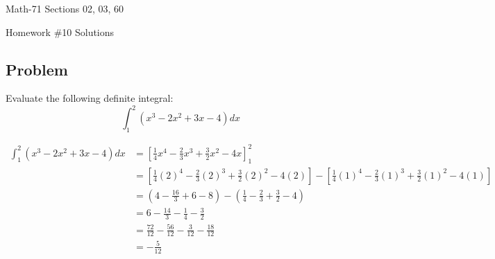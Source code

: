 \documentclass[letterpaper,12pt,fleqn]{article}
\begin{document}
\begin{center}
  \large
  Math-71 Sections 02, 03, 60

  \Large
  Homework \#10 Solutions
\end{center}

\subsection*{Problem}

Evaluate the following definite integral:
\[\int_1^2\left(x^3-2x^2+3x-4\right)dx\]

\begin{align*}
  \int_1^2\left(x^3-2x^2+3x-4\right)dx &= \left[\frac{1}{4}x^4-\frac{2}{3}x^3+\frac{3}{2}x^2-4x\right]_1^2 \\
  &= \left[\frac{1}{4}(2)^4-\frac{2}{3}(2)^3+\frac{3}{2}(2)^2-4(2)\right]-
  \left[\frac{1}{4}(1)^4-\frac{2}{3}(1)^3+\frac{3}{2}(1)^2-4(1)\right] \\
  &= \left(4-\frac{16}{3}+6-8\right)-\left(\frac{1}{4}-\frac{2}{3}+\frac{3}{2}-4\right) \\
  &= 6-\frac{14}{3}-\frac{1}{4}-\frac{3}{2} \\
  &= \frac{72}{12}-\frac{56}{12}-\frac{3}{12}-\frac{18}{12} \\
  &= -\frac{5}{12}
\end{align*}
\end{document}
